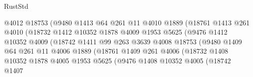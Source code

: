 \begin{lexlean}{RustStd}
\begin{coremodule}
                                @4012
                                @18753
                                (@9480
                                  @1413
                                  @64
                                  @261
                                  @11
                                  @4010
                                  @1889
                                  (@18761
                                    @1413
                                    @261
                                    @4010
                                    (@18732
                                      @1412
                                      @10352
                                      @1878
                                      @4009
                                      @1953
                                      @5625
                                      (@9476
                                        @1412
                                        @10352
                                        @4009
                                        (@18742
                                          @1411
                                          @99
                                          @263
                                          @3639
                                          @4008
                                          @18753
                                          (@9480
                                            @1409
                                            @64
                                            @261
                                            @11
                                            @4006
                                            @1889
                                            (@18761
                                              @1409
                                              @261
                                              @4006
                                              (@18732
                                                @1408
                                                @10352
                                                @1878
                                                @4005
                                                @1953
                                                @5625
                                                (@9476
                                                  @1408
                                                  @10352
                                                  @4005
                                                  (@18742
                                                    @1407

\end{coremodule}
\end{lexlean}
